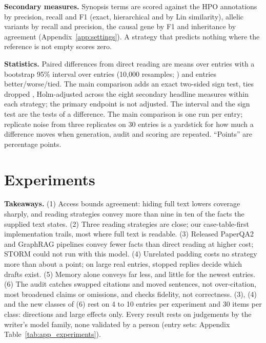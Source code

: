 \documentclass{article} %
\begin{document}
\textbf{Secondary measures.} Synopsis terms are scored against the HPO annotations by precision, recall and F1 (exact, hierarchical and by Lin similarity), allelic variants by recall and precision, the causal gene by F1 and inheritance by agreement (Appendix~\ref{app:settings}). A strategy that predicts nothing where the reference is not empty scores zero.

\textbf{Statistics.} Paired differences from direct reading are means over entries with a bootstrap 95\% interval over entries (10,000 resamples; \citealp{Efron1979BootstrapMethods}) and entries better/worse/tied. The main comparison adds an exact two-sided sign test, ties dropped \citep{Dixon1946StatisticalSign}, Holm-adjusted \citep{holm1979simple} across the eight secondary headline measures within each strategy; the primary endpoint is not adjusted. The interval and the sign test are the tests of a difference. The main comparison is one run per entry; replicate noise from three replicates on 30 entries is a yardstick for how much a difference moves when generation, audit and scoring are repeated. ``Points'' are percentage points.

\section{Experiments}
\label{sec:experiments}
\textbf{Takeaways.} (1) Access bounds agreement: hiding full text lowers coverage sharply, and reading strategies convey more than nine in ten of the facts the supplied text states. (2) Three reading strategies are close; our case-table-first implementation trails, most where full text is readable. (3) Released PaperQA2 and GraphRAG pipelines convey fewer facts than direct reading at higher cost; STORM could not run with this model. (4) Unrelated padding costs no strategy more than about a point; on large real entries, stopped replies decide which drafts exist. (5) Memory alone conveys far less, and little for the newest entries. (6) The audit catches swapped citations and moved sentences, not over-citation, most broadened claims or omissions, and checks fidelity, not correctness. (3), (4) and the new classes of (6) rest on 4 to 10 entries per experiment and 30 items per class: directions and large effects only. Every result rests on judgements by the writer's model family, none validated by a person (entry sets: Appendix Table~\ref{tab:app_experiments}).
\end{document}
